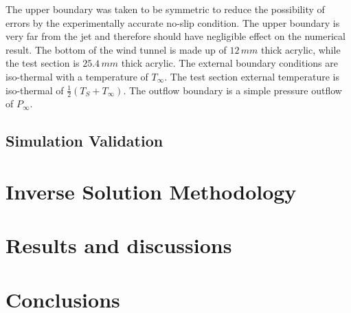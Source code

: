 \documentclass[preprint,12pt]{elsarticle}
\begin{document}
The upper boundary was taken to be symmetric to reduce the possibility of errors by the experimentally accurate no-slip condition.  The upper boundary is very far from the jet and therefore should have negligible effect on the numerical result.  The bottom of the wind tunnel is made up of $12\, mm$ thick acrylic, while the test section is $25.4\,mm$ thick acrylic.  The external boundary conditions are iso-thermal with a temperature of $T_{\infty}$.  The test section external temperature is iso-thermal of $\frac{1}{2}\left(T_S+T_{\infty}\right)$.  The outflow boundary is a simple pressure outflow of $P_{\infty}$.

\subsection{Simulation Validation}



\section{Inverse Solution Methodology}





\section{Results and discussions}


\section{Conclusions}

\appendix

{}

\end{document}

